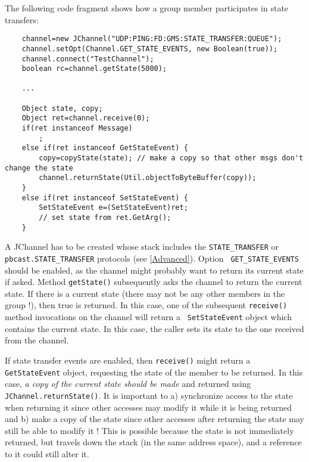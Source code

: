     The following code fragment shows how a group member participates in state
    transfers:

    \begin{small}
    \begin{verbatim}
    channel=new JChannel("UDP:PING:FD:GMS:STATE_TRANSFER:QUEUE");
    channel.setOpt(Channel.GET_STATE_EVENTS, new Boolean(true));
    channel.connect("TestChannel");
    boolean rc=channel.getState(5000);

    ...

    Object state, copy;
    Object ret=channel.receive(0);
    if(ret instanceof Message)
        ;
    else if(ret instanceof GetStateEvent) {
        copy=copyState(state); // make a copy so that other msgs don't change the state
        channel.returnState(Util.objectToByteBuffer(copy));
    }
    else if(ret instanceof SetStateEvent) {
        SetStateEvent e=(SetStateEvent)ret;
        // set state from ret.GetArg();
    }
    \end{verbatim}
    \end{small}


    A JChannel has to be created whose stack includes the {\tt STATE\_TRANSFER} or
    {\tt pbcast.STATE\_TRANSFER} protocols (see \ref{Advanced}). Option {\tt
    GET\_STATE\_EVENTS} should be enabled, as the channel might probably want to
    return its current state if asked. Method {\tt getState()} subsequently asks the
    channel to return the current state. If there is a current state (there may not
    be any other members in the group !), then true is returned. In this case, one of
    the subsequent {\tt receive()} method invocations on the channel will return a {\tt
    SetStateEvent} object which contains the current state. In this case, the caller
    sets its state to the one received from the channel.

    If state transfer events are enabled, then {\tt receive()} might return a {\tt
    GetStateEvent} object, requesting the state of the member to be returned. In this
    case, {\em a copy of the current state should be made} and returned using {\tt
    JChannel.returnState()}. It is important to a) synchronize access to the state when
    returning it since other accesses may modify it while it is being returned and b)
    make a copy of the state since other accesses after returning the state may still
    be able to modify it ! This is possible because the state is not immediately
    returned, but travels down the stack (in the same address space), and a reference
    to it could still alter it.

